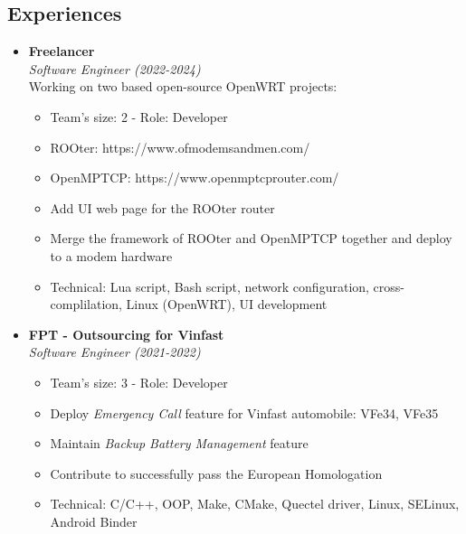 \documentclass[10pt,oneside,a4paper]{article}
\begin{document}
\begin{tcolorbox}
\begin{minipage}[t]{11cm}
\begin{tcolorbox}[grow to right by=0.75cm,colback=white,colframe=white]
            \section*{Experiences}
            \begin{itemize}
                \item 
                {
                    \textbf{Freelancer} \\
                    \emph{Software Engineer (2022-2024)} \\
                    Working on two based open-source OpenWRT projects:
                    \begin{itemize}[label=$\circ$]
                        \item {Team's size: 2 - Role: Developer}
                        \item {ROOter: https://www.ofmodemsandmen.com/}
                        \item {OpenMPTCP: https://www.openmptcprouter.com/}
                        \item {Add UI web page for the ROOter router}
                        \item {Merge the framework of ROOter and OpenMPTCP together and deploy to a modem hardware}
                        \item {Technical: Lua script, Bash script, network configuration, cross-complilation, Linux (OpenWRT), UI development}
                    \end{itemize}
                }
                \item
                {
                    \textbf{FPT - Outsourcing for Vinfast} \\
                    \emph{Software Engineer (2021-2022)}
                    \begin{itemize}[label=$\circ$]
                        \item {Team's size: 3 - Role: Developer}
                        \item {Deploy \textit{Emergency Call} feature for Vinfast automobile: VFe34, VFe35}
                        \item {Maintain \textit{Backup Battery Management} feature}
                        \item {Contribute to successfully pass the European Homologation}
                        \item {Technical: C/C++, OOP, Make, CMake, Quectel driver, Linux, SELinux, Android Binder}
                    \end{itemize}
}
\end{itemize}
\end{tcolorbox}
\end{minipage}
\end{tcolorbox}
\end{document}
